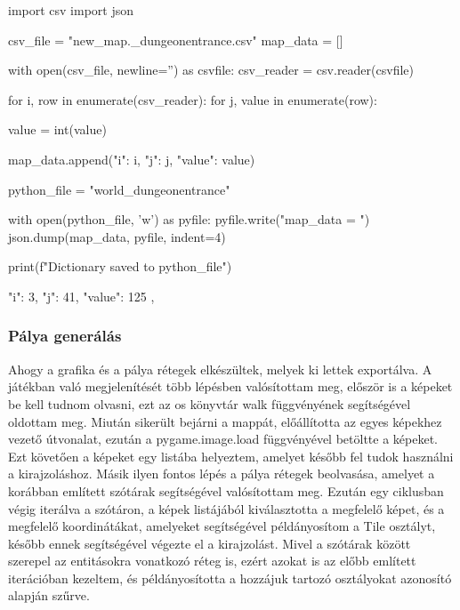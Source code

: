 \begin{python}[caption={CSV formátum dictionary formátumra konvertálása},label=py:csvtodict]
    import csv
    import json
    
    csv_file = "new_map\MSmap._dungeonentrance.csv"
    map_data = []
    
    with open(csv_file, newline='') as csvfile:
        csv_reader = csv.reader(csvfile)
    
        for i, row in enumerate(csv_reader):
            for j, value in enumerate(row):
    
                value = int(value)
    
                    map_data.append({"i": i, "j": j, "value": value})
    
    python_file = "world_dungeonentrance"
    
    with open(python_file, 'w') as pyfile:
        pyfile.write("map_data = ")
        json.dump(map_data, pyfile, indent=4)
    
    print(f"Dictionary saved to {python_file}")
    
\end{python}\cite{csv-to-dict}


\begin{python}[caption={Minta az átalakított struktúrára}, label=py:átalakított struktúra]
    {
        "i": 3,
        "j": 41,
        "value": 125
    },
\end{python}\cite{dict-structure}


\subsubsection{Pálya generálás}

\indent \indent Ahogy a grafika és a pálya rétegek elkészültek, melyek ki lettek exportálva. A játékban való megjelenítését több lépésben valósítottam meg, először is a képeket be kell tudnom olvasni, ezt az os könyvtár walk függvényének segítségével oldottam meg. Miután sikerült bejárni a mappát, előállította az egyes képekhez vezető útvonalat, ezután a pygame.image.load függvényével betöltte a képeket. Ezt követően a képeket egy listába helyeztem, amelyet később fel tudok használni a kirajzoláshoz. Másik ilyen fontos lépés a pálya rétegek beolvasása, amelyet a korábban említett szótárak segítségével valósítottam meg. Ezután egy ciklusban végig iterálva a szótáron, a képek listájából kiválasztotta a megfelelő képet, és a megfelelő koordinátákat, amelyeket segítségével példányosítom a Tile osztályt, később ennek segítségével végezte el a kirajzolást. Mivel a szótárak között szerepel az entitásokra vonatkozó réteg is, ezért azokat is az előbb említett iterációban kezeltem, és példányosította a hozzájuk tartozó osztályokat azonosító alapján szűrve.

